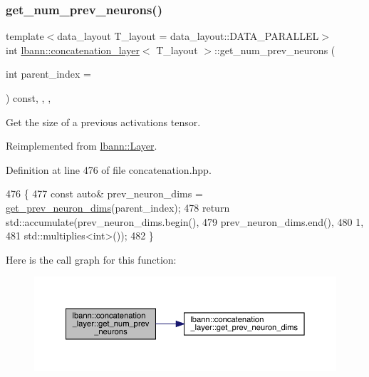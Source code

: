 \subsubsection{\texorpdfstring{get\+\_\+num\+\_\+prev\+\_\+neurons()}{get\_num\_prev\_neurons()}}
{\footnotesize\ttfamily template$<$data\+\_\+layout T\+\_\+layout = data\+\_\+layout\+::\+D\+A\+T\+A\+\_\+\+P\+A\+R\+A\+L\+L\+EL$>$ \\
int \hyperlink{classlbann_1_1concatenation__layer}{lbann\+::concatenation\+\_\+layer}$<$ T\+\_\+layout $>$\+::get\+\_\+num\+\_\+prev\+\_\+neurons (\begin{DoxyParamCaption}\item[{int}]{parent\+\_\+index = {} }\end{DoxyParamCaption}) const\hspace{0.3cm}{\ttfamily [inline]}, {\ttfamily [override]}, {\ttfamily [protected]}, {\ttfamily [virtual]}}

Get the size of a previous activations tensor. 

Reimplemented from \hyperlink{classlbann_1_1Layer_a27112eb70bbfbd7f3c3e749960400dec}{lbann\+::\+Layer}.



Definition at line 476 of file concatenation.\+hpp.


\begin{DoxyCode}
476                                                                 \{
477     \textcolor{keyword}{const} \textcolor{keyword}{auto}& prev\_neuron\_dims = \hyperlink{classlbann_1_1concatenation__layer_af0e60f4a7e00657ceb429aaa8d7f5040}{get\_prev\_neuron\_dims}(parent\_index);
478     \textcolor{keywordflow}{return} std::accumulate(prev\_neuron\_dims.begin(),
479                            prev\_neuron\_dims.end(),
480                            1,
481                            std::multiplies<int>());
482   \}
\end{DoxyCode}
Here is the call graph for this function\+:\nopagebreak
\begin{figure}[H]
\begin{center}
\leavevmode
\includegraphics[width=350pt]{classlbann_1_1concatenation__layer_aca8e6d21d827a3d5a8434db88bf3e63a_cgraph}
\end{center}
\end{figure}
\mbox{\label{classlbann_1_1concatenation__layer_af0e60f4a7e00657ceb429aaa8d7f5040}} 
